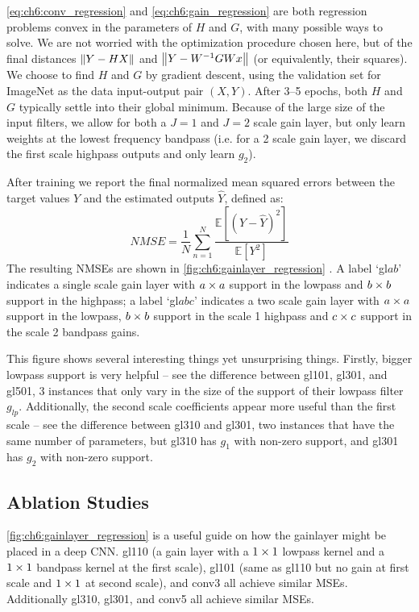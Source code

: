 \eqref{eq:ch6:conv_regression} and \eqref{eq:ch6:gain_regression} are both
regression problems convex in the parameters of $H$ and $G$, with many possible
ways to solve. We are not worried with the optimization procedure chosen here,
but of the final distances $\left\lVert Y-HX \right\rVert$ and $\left\lVert Y-W^{-1}GWx \right\rVert$ (or
equivalently, their squares). We choose to find $H$ and $G$ by gradient descent,
using the validation set for ImageNet as the data input-output pair $(X, Y)$.
After 3--5 epochs, both $H$ and $G$ typically settle into their global minimum.
Because of the large size of the input filters, we allow for both a $J=1$ and
$J=2$ scale gain layer, but only learn weights at the lowest frequency bandpass
(i.e. for a 2 scale gain layer, we discard the first scale highpass outputs and
only learn $g_2$). 

After training we report the final normalized mean squared errors between the
target values $Y$ and the estimated outputs $\hat{Y}$, defined as:
\begin{equation}
  NMSE = \frac{1}{N} \sum_{n=1}^N \frac{\mathbb{E}\left[(Y-\hat{Y})^2\right]}{\mathbb{E}\left[Y^2\right]}
\end{equation}
The resulting NMSEs are shown in \autoref{fig:ch6:gainlayer_regression} . A label
`gl$ab$' indicates a single scale gain layer with $a\times a$ support in the lowpass
and $b\times b$ support in the highpass; a label `gl$abc$' indicates a two scale
gain layer with $a\times a$ support in the lowpass, $b\times b$ support in the scale 1
highpass and $c\times c$ support in the scale 2 bandpass gains.

This figure shows several interesting things yet unsurprising things. Firstly,
bigger lowpass support is very helpful -- see the difference between gl101,
gl301, and gl501, 3 instances that only vary in the size of the support of their
lowpass filter $g_{lp}$. Additionally, the second scale coefficients appear more
useful than the first scale -- see the difference between gl310 and gl301, two
instances that have the same number of parameters, but gl310 has $g_1$ with
non-zero support, and gl301 has $g_2$ with non-zero support.

\subsection{Ablation Studies}
\autoref{fig:ch6:gainlayer_regression} is a useful guide on how the gainlayer
might be placed in a deep CNN. gl110 (a gain layer with a $1\times1$ lowpass kernel
and a $1\times1$ bandpass kernel at the first scale), gl101 (same as gl110 but no
gain at first scale and $1\times 1$ at second scale), and conv3 all achieve similar
MSEs. Additionally gl310, gl301, and conv5 all achieve similar MSEs. 

